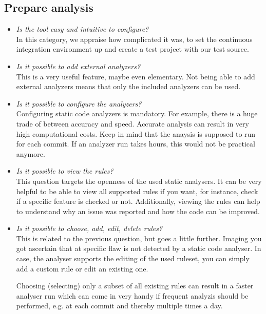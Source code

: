 \documentclass[conference]{IEEEtran}
\begin{document}
\subsection{Prepare analysis}
\begin{itemize}
	\item \textit{Is the tool easy and intuitive to configure?} \\
	In this category, we appraise how complicated it was, to set the continuous integration environment up and create a test project with our test source.
	
	\item \textit{Is it possible to add external analyzers?} \\
	This is a very useful feature, maybe even elementary. Not being able to add external analyzers means that only the included analyzers can be used.
	
	\item \textit{Is it possible to configure the analyzers?} \\
	Configuring static code analyzers is mandatory. For example, there is a huge trade of between accuracy and speed. Accurate analysis can result in very high computational costs. Keep in mind that the anaysis is supposed to run for each commit. If an analyzer run takes hours, this would not be practical anymore.
	
	\item \textit{Is it possible to view the rules?} \\
	This question targets the openness of the used static analysers. It can be very helpful to be able to view all supported rules if you want, for instance, check if a specific feature is checked or not. Additionally, viewing the rules can help to understand why an issue was reported and how the code can be improved.
	
	\item \textit{Is it possible to choose, add, edit, delete rules?} \\
	This is related to the previous question, but goes a little further. Imaging you got ascertain that at specific flaw is not detected by a static code analyser. In case, the analyser supports the editing of the used ruleset, you can simply add a custom rule or edit an existing one.
	
	Choosing (selecting) only a subset of all existing rules can result in a faster analyser run which can come in very handy if frequent analyzis should be performed, e.g. at each commit and thereby multiple times a day.
\end{itemize}
\end{document}

